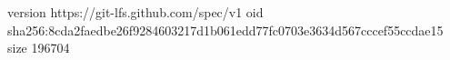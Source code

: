 version https://git-lfs.github.com/spec/v1
oid sha256:8cda2faedbe26f9284603217d1b061edd77fc0703e3634d567cccef55ccdae15
size 196704
